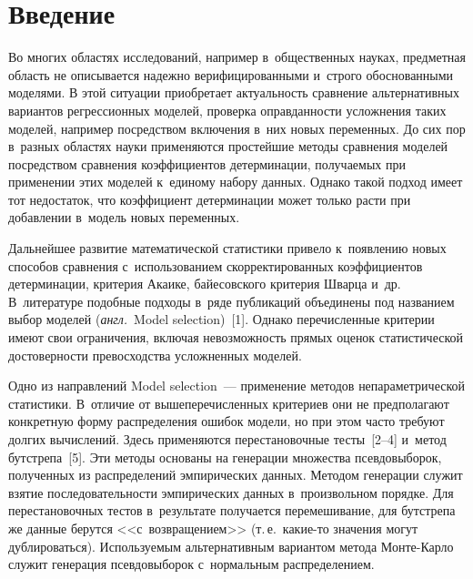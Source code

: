  



\thispagestyle{headings}

\begin{multicols}{2}

\label{st\stat}
  
  
\section{Введение}

  Во многих областях исследований, например в~общественных науках, предметная 
область не описывается надежно верифицированными и~строго обоснованными 
моделями. В этой ситуации приобретает актуальность сравнение альтернативных 
вариантов регрессионных моделей, проверка оправданности усложнения таких моделей, 
например посредством включения в~них новых переменных. До сих пор в~разных 
областях науки применяются простейшие методы сравнения моделей посредством 
сравнения коэффициентов детерминации, получаемых при применении этих моделей 
к~единому набору данных. Однако такой подход имеет тот недостаток, что коэффициент 
детерминации может только расти при добавлении в~модель новых переменных. 

Дальнейшее развитие математической статистики привело к~появлению новых способов 
сравнения с~использованием скорректированных ко\-эффициентов детерминации, 
критерия Акаике, байесовского критерия Шварца и~др. В~литературе подобные подходы 
в~ряде публикаций объединены под названием выбор моделей (\textit{англ.}\ Model 
selection)~[1]. Однако перечисленные критерии имеют свои ограничения, включая 
невозможность прямых оценок статистической до\-сто\-вер\-ности превосходства 
усложненных моделей.
  
  Одно из направлений Model selection~--- применение методов непараметрической 
статистики. В~отличие от вышеперечисленных критериев они не предполагают 
конкретную форму распределения ошибок модели, но при этом часто требуют долгих 
вычислений. Здесь применяются перестановочные тесты~[2--4] и~метод бутстрепа~[5]. 
Эти методы основаны на генерации множества псевдовыборок, полученных из 
распределений эмпирических данных. Методом генерации служит взятие 
последовательности эмпирических данных в~произвольном порядке. Для 
перестановочных тестов в~результате получается перемешивание, для бутстрепа же 
данные берутся <<с~возвращением>> (т.\,е.\ ка\-кие-то значения могут дублироваться). 
Используемым альтернативным вариантом метода Монте-Карло служит генерация 
псевдовыборок с~нормальным распределением.
  

\end{multicols}
